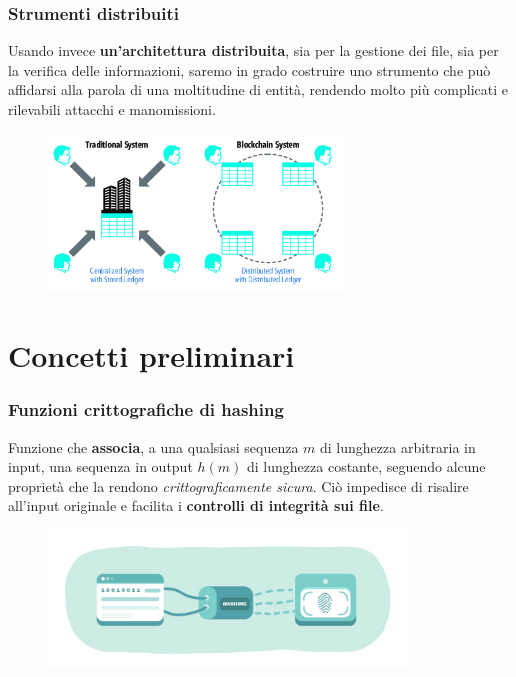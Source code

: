 \documentclass{beamer}
\begin{document}
\begin{frame}
	\frametitle{Strumenti distribuiti}
		Usando invece \textbf{un'architettura distribuita}, sia per la gestione dei file,
		sia per la verifica delle informazioni, saremo in grado costruire uno strumento
		che può affidarsi alla parola di una moltitudine di entità, rendendo molto
		più complicati e rilevabili attacchi e manomissioni.
	\medskip
	\begin{figure}
		\includegraphics[width=0.70\textwidth]{dece.jpg}
	\end{figure}
\end{frame}

\section{Concetti preliminari}
\begin{frame}
	\frametitle{Funzioni crittografiche di hashing}
	Funzione che \textbf{associa},
	a una qualsiasi sequenza \(m\) di lunghezza arbitraria in input, una sequenza
	in output \(h(m)\) di lunghezza costante,
	seguendo alcune proprietà che la rendono
	\emph{crittograficamente sicura}.
	Ciò impedisce di risalire all'input originale
	e facilita i \textbf{controlli di integrità sui file}.
	\begin{figure}
		\includegraphics[width=0.85\textwidth]{figures/hashing.jpg}
	\end{figure}
\end{frame}
\end{document}
